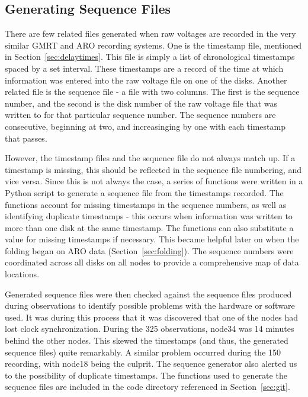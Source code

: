 \documentclass[a4paper,12pt]{article}
\begin{document}
\subsection{Generating Sequence Files}
\label{generatingsequencefiles}
There are few related files generated when raw voltages are recorded in the very similar GMRT and ARO recording systems. One is the timestamp file, mentioned in Section~\ref{sec:delaytimes}. This file is simply a list of chronological timestamps spaced by a set interval. These timestamps are a record of the time at which information was entered into the raw voltage file on one of the disks. Another related file is the sequence file - a file with two columns. The first is the sequence number, and the second is the disk number of the raw voltage file that was written to for that particular sequence number. The sequence numbers are consecutive, beginning at two, and increasinging by one with each timestamp that passes.

However, the timestamp files and the sequence file do not always match up. If a timestamp is missing, this should be reflected in the sequence file numbering, and vice versa. Since this is not always the case, a series of functions were written in a Python script to generate a sequence file from the timestamps recorded. The functions account for missing timestamps in the sequence numbers, as well as identifying duplicate timestamps - this occurs when information was written to more than one disk at the same timestamp. The functions can also substitute a value for missing timestamps if necessary. This became helpful later on when the folding began on ARO data (Section~\ref{sec:folding}). The sequence numbers were coordinated across all disks on all nodes to provide a comprehensive map of data locations.

Generated sequence files were then checked against the sequence files produced during observations to identify possible problems with the hardware or software used. It was during this process that it was discovered that one of the nodes had lost clock synchronization. During the \unit{325}{\mega\hertz} observations, node34 was 14 minutes behind the other nodes. This skewed the timestamps (and thus, the generated sequence files) quite remarkably. A similar problem occurred during the \unit{150}{\mega\hertz} recording, with node18 being the culprit. The sequence generator also alerted us to the possibility of duplicate timestamps. The functions used to generate the sequence files are included in the code directory referenced in Section~\ref{sec:git}.
\end{document}
